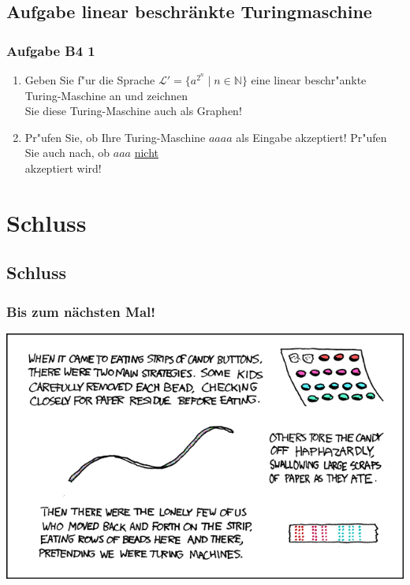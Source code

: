 \subsection{Aufgabe linear beschränkte Turingmaschine}
\begin{frame}
\frametitle{Aufgabe B4 1}
\begin{enumerate}
\item Geben Sie f"ur die Sprache $\mathcal{L}' = \{a^{2^n} \; | \; n \in
\mathbb{N}\}$ eine linear beschr"ankte Turing-Maschine an und zeichnen\\
Sie diese Turing-Maschine auch als Graphen!
\item Pr"ufen Sie, ob Ihre Turing-Maschine $aaaa$ als Eingabe akzeptiert!
Pr"ufen Sie auch nach, ob $aaa$ \underline{nicht}\\
akzeptiert wird!
\end{enumerate}
\end{frame}

\section{Schluss}
\subsection{Schluss}
\begin{frame}
\frametitle{Bis zum nächsten Mal!}
\begin{center}
  \includegraphics[width=1 \textheight]{images/xkcd_205.png}
\end{center}
\end{frame}

